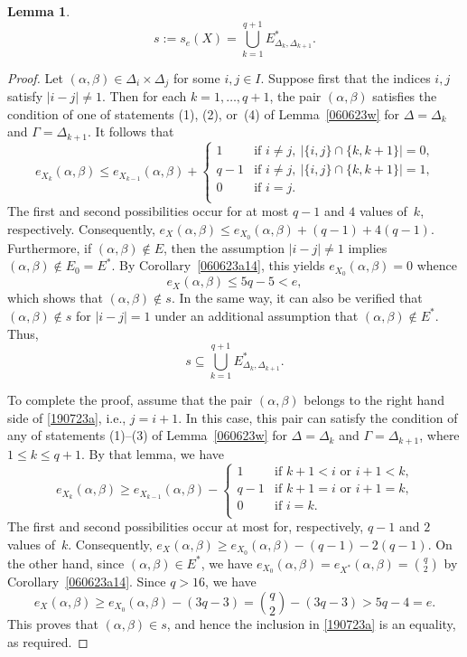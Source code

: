 \documentclass{amsart}
\newtheorem{lemma}[formula]{Lemma}
\def\qtnl#1{\begin{equation}\label{#1}}
\def\eqtn{\end{equation}}
\def\lmml#1{\begin{lemma}\label{#1}}
\def\elmm{\end{lemma}}
\def\css{\begin{cases}}
\def\ecss{\end{cases}}
\def\prf{\begin{proof}}
\def\eprf{\end{proof}}
\begin{document}
\lmml{160623a}
$$
s:=s_e(X)=\bigcup_{k=1}^{q+1}E^*_{\Delta_k,\Delta_{k+1}}.
$$
\elmm
\prf
Let $(\alpha,\beta)\in \Delta_i\times\Delta_j$ for some $i,j\in I$.
Suppose first that the indices $i,j$ satisfy $|i-j|\ne 1$. 
Then for each $k=1,\ldots,q+1$, the pair $(\alpha,\beta)$ satisfies the condition  of one of statements (1), (2), or~(4) of Lemma~\ref{060623w} for $\Delta=\Delta_k$ and $\Gamma=\Delta_{k+1}$. It follows that
$$
e_{X_k}(\alpha,\beta)\le e_{X_{k-1}}(\alpha,\beta)+
\css
1     &\text{if $i\ne j,\  |\{i,j\}\cap\{k,k+1\}|=0$,}\\   q-1 &\text{if $i\ne j,\  |\{i,j\}\cap\{k,k+1\}|=1$,}\\ 0    &\text{if $i=j$.}\\
\ecss
$$
The first and second possibilities occur for at most $q-1$ and $4$ values of~$k$, respectively. Consequently, $e_{X^{}}(\alpha,\beta)\le e_{X_0}(\alpha,\beta)+(q-1)+4(q-1)$. Furthermore, if $(\alpha,\beta)\not\in E$, then the assumption  $|i-j|\ne 1$ implies $(\alpha,\beta)\not\in E_0=E^*$. By Corollary~\ref{060623a14}, this yields $e_{X_0}(\alpha,\beta)=0$ whence
$$
e_{X^{}}(\alpha,\beta)\le 5q-5<e,
$$
which shows that $(\alpha,\beta)\not\in s$. In the same way, it 
can also be verified that $(\alpha,\beta)\not\in s$ 
for $|i-j|=1$ under an additional assumption that $(\alpha,\beta)\not\in E^*$. Thus,
\qtnl{190723a}
s\subseteq \bigcup_{k=1}^{q+1} E^*_{\Delta_k,\Delta_{k+1}}.
\eqtn

To complete the proof, assume that the pair $(\alpha,\beta)$ belongs to the right hand side of \eqref{190723a},  i.e., $j=i+1$.  In this case, this pair can satisfy the condition of any of statements (1)--(3) of Lemma~\ref{060623w} for $\Delta=\Delta_k$ and $\Gamma=\Delta_{k+1}$, where $1\le k\le q+1$. 
By that lemma, we have
$$
e_{X_k}(\alpha,\beta)\ge  e_{X_{k-1}}(\alpha,\beta)-
\css
1     &\text{if $k+1<i$ or $i+1< k$,}\\
q-1 &\text{if $k+1=i$ or $i+1=k$,}\\
0    &\text{if $i=k$.}\\
\ecss
$$
The first and second possibilities occur at most for, respectively, 
$q-1$ and $2$ values of~$k$.
Consequently, $e_{X^{}}(\alpha,\beta)\ge e_{X_0}(\alpha,\beta)-(q-1)-2(q-1)$. On the other hand, since $(\alpha,\beta)\in E^*$, we have  $e_{X_0}(\alpha,\beta)= e_{X^*}(\alpha,\beta)=\binom{q}{2}$ by Corollary~\ref{060623a14}. Since $q>16$, we have
$$
e_{X^{}}(\alpha,\beta)\ge e_{X_0}(\alpha,\beta)-(3q-3)=\binom{q}{2}-(3q-3)>5q-4=e.
$$
This proves that $(\alpha,\beta)\in s$, and hence the inclusion in \eqref{190723a} is an equality, as required.
\eprf
\end{document}
